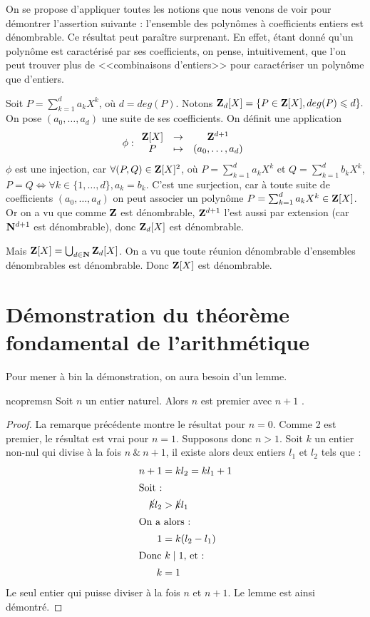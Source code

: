 \documentclass[a4paper,french,final]{memoir}
\begin{document}
On se propose d'appliquer toutes les notions que nous venons de voir pour démontrer l'assertion suivante : l'ensemble des polynômes à coefficients entiers est dénombrable. Ce résultat peut paraître surprenant. En effet, étant donné qu'un polynôme est caractérisé par ses coefficients, on pense, intuitivement, que l'on peut trouver plus de <<combinaisons d'entiers>> pour caractériser un polynôme que d'entiers.

Soit $P = \sum_{k = 1}^d a_k X^k $, où $d = deg(P)$. Notons $\mathbf{Z}_d[X] = \{P \in \mathbf{Z}[X], deg(P) \leqslant d \}.$
On pose  $(a_0, \dots, a_d) $ une suite de ses coefficients. On définit une application \[\phi : \begin{array}{ccc}
\ZZ[X] & \to & \ZZ^{d+1}\\
P & \mapsto & (a_0, \dots, a_d)
\end{array}\]
$\phi$ est une injection, car $\forall (P,Q) \in \mathbf{Z}[X]^2$, où $P = \sum_{k=1}^d a_k X^k$ et $Q = \sum_{k=1}^d b_k X^k$, $ P = Q \iff \forall k \in \{1,\dots, d\}, a_k = b_k$. C'est une surjection, car à toute suite de coefficients $(a_0,\dots, a_d)$ on peut associer un polynôme $P = \sum_{k=1}^d a_k X^k \in \mathbf{Z}[X]$. Or on a vu que comme $\mathbf{Z}$ est dénombrable, $\mathbf{Z}^{d+1}$ l'est aussi par extension (car $\mathbf{N}^{d+1}$ est dénombrable), donc $\mathbf{Z}_d[X]$ est dénombrable.

\noindent Mais $\mathbf{Z}[X] = \bigcup_{d \in \mathbf{N}} \mathbf{Z}_d[X]$. On a vu que toute réunion dénombrable d'ensembles dénombrables est dénombrable. Donc $\mathbf{Z}[X]$ est dénombrable.
\raggedright
\begingroup
\nocite{*}
\printbibliography
\endgroup
\appendixpage
\appendix
\chapter{Démonstration du théorème fondamental de l'arithmétique}\label{annexe:thmfondarith}
Pour mener à bin la démonstration, on aura besoin d'un lemme.
\begin{lemmab}{}{ncopremsn}
  Soit $n$ un entier naturel. Alors $n$ est premier avec $n+1$ .
\end{lemmab}
\begin{proof}
La remarque précédente montre le résultat pour $n=0$. Comme 2 est premier, le résultat est vrai pour $n=1$. Supposons donc $n>1$. Soit  $k$ un entier non-nul qui divise à la fois $n~\&~n+1$, il existe alors deux entiers $l_1$ et $l_2$ tels que :  
\begin{align*}
  n+1& =kl_2=kl_{1}+1\\
\shortintertext{Soit~:} 
\cancel{k}l_2& >\cancel{k}l_1\\
\shortintertext{On a alors~:} 
1& =k(l_2-l_1)\\
\intertext{Donc $k \mid 1$, et : }
k& =1
\end{align*}
Le seul entier qui puisse diviser à la fois $n$ et $n+1$. Le lemme est ainsi démontré.
\end{proof}
\end{document}
